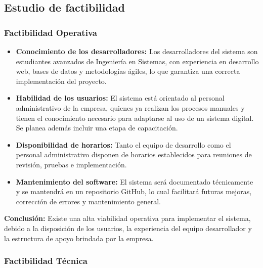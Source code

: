 \newpage
\subsection{Estudio de factibilidad}

\subsubsection{Factibilidad Operativa}

\begin{itemize}
	\item \textbf{Conocimiento de los desarrolladores:} Los desarrolladores del sistema son estudiantes avanzados de Ingeniería en Sistemas, con experiencia en desarrollo web, bases de datos y metodologías ágiles, lo que garantiza una correcta implementación del proyecto.

	\item \textbf{Habilidad de los usuarios:} El sistema está orientado al personal administrativo de la empresa, quienes ya realizan los procesos manuales y tienen el conocimiento necesario para adaptarse al uso de un sistema digital. Se planea además incluir una etapa de capacitación.

	\item \textbf{Disponibilidad de horarios:} Tanto el equipo de desarrollo como el personal administrativo disponen de horarios establecidos para reuniones de revisión, pruebas e implementación.

	\item \textbf{Mantenimiento del software:} El sistema será documentado técnicamente y se mantendrá en un repositorio GitHub, lo cual facilitará futuras mejoras, corrección de errores y mantenimiento general.
\end{itemize}

\textbf{Conclusión:} Existe una alta viabilidad operativa para implementar el sistema, debido a la disposición de los usuarios, la experiencia del equipo desarrollador y la estructura de apoyo brindada por la empresa.

\subsubsection{Factibilidad Técnica}

